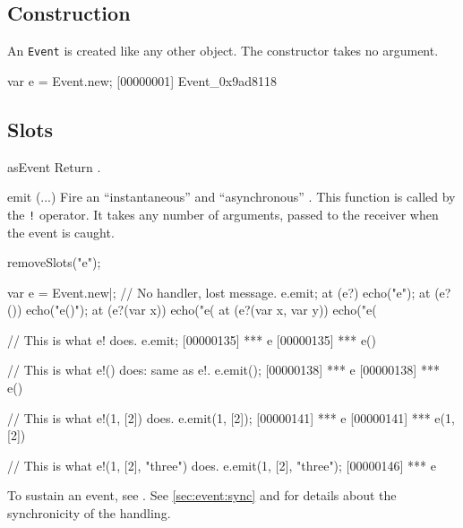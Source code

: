 \subsection{Construction}
\label{sec:stdlib:event:ctor}

An \lstinline{Event} is created like any other object.  The constructor
takes no argument.

\begin{urbiscript}[firstnumber=1]
var e = Event.new;
[00000001] Event_0x9ad8118
\end{urbiscript}

\subsection{Slots}
\begin{urbiscriptapi}
\item[asEvent]
  Return \this.

\item[emit](...)%
  Fire an ``instantaneous'' and ``asynchronous'' . This
  function is called by the \lstinline|!| operator.  It takes any number of
  arguments, passed to the receiver when the event is caught.
\begin{urbicomment}
removeSlots("e");
\end{urbicomment}
\begin{urbiscript}
var e = Event.new|;
// No handler, lost message.
e.emit;
at (e?)               echo("e");
at (e?())             echo("e()");
at (e?(var x))        echo("e(%
at (e?(var x, var y)) echo("e(%

// This is what e! does.
e.emit;
[00000135] *** e
[00000135] *** e()

// This is what e!() does: same as e!.
e.emit();
[00000138] *** e
[00000138] *** e()

// This is what e!(1, [2]) does.
e.emit(1, [2]);
[00000141] *** e
[00000141] *** e(1, [2])

// This is what e!(1, [2], "three") does.
e.emit(1, [2], "three");
[00000146] *** e
\end{urbiscript}

To sustain an event, see .  See \autoref{sec:event:sync}
and  for details about the synchronicity of the handling.



\end{urbiscriptapi}

